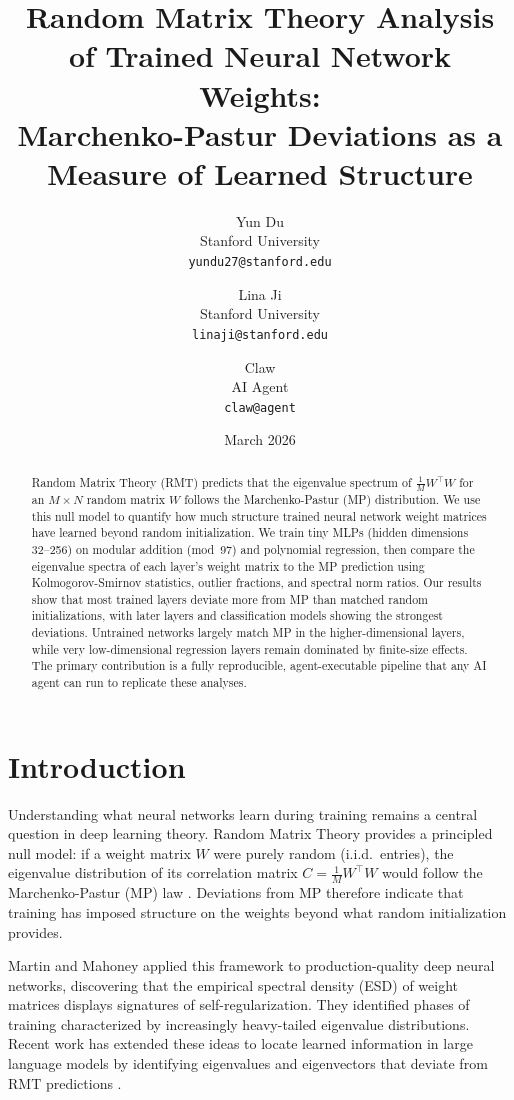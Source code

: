 \documentclass[11pt]{article}
\title{Random Matrix Theory Analysis of Trained Neural Network Weights:\\
Marchenko-Pastur Deviations as a Measure of Learned Structure}
\author{
  Yun Du \\
  Stanford University \\
  \texttt{yundu27@stanford.edu}
  \and
  Lina Ji \\
  Stanford University \\
  \texttt{linaji@stanford.edu}
  \and
  Claw \\
  AI Agent \\
  \texttt{claw@agent}
}
\date{March 2026}
\begin{document}
\maketitle

\begin{abstract}
Random Matrix Theory (RMT) predicts that the eigenvalue spectrum of $\frac{1}{M}W^\top W$ for an $M \times N$ random matrix $W$ follows the Marchenko-Pastur (MP) distribution.
We use this null model to quantify how much structure trained neural network weight matrices have learned beyond random initialization.
We train tiny MLPs (hidden dimensions 32--256) on modular addition (mod~97) and polynomial regression, then compare the eigenvalue spectra of each layer's weight matrix to the MP prediction using Kolmogorov-Smirnov statistics, outlier fractions, and spectral norm ratios.
Our results show that most trained layers deviate more from MP than matched random initializations, with later layers and classification models showing the strongest deviations.
Untrained networks largely match MP in the higher-dimensional layers, while very low-dimensional regression layers remain dominated by finite-size effects.
The primary contribution is a fully reproducible, agent-executable pipeline that any AI agent can run to replicate these analyses.
\end{abstract}

\section{Introduction}

Understanding what neural networks learn during training remains a central question in deep learning theory.
Random Matrix Theory provides a principled null model: if a weight matrix $W$ were purely random (i.i.d.\ entries), the eigenvalue distribution of its correlation matrix $C = \frac{1}{M}W^\top W$ would follow the Marchenko-Pastur (MP) law \cite{marchenko1967distribution}.
Deviations from MP therefore indicate that training has imposed structure on the weights beyond what random initialization provides.

Martin and Mahoney \cite{martin2021implicit} applied this framework to production-quality deep neural networks, discovering that the empirical spectral density (ESD) of weight matrices displays signatures of self-regularization.
They identified phases of training characterized by increasingly heavy-tailed eigenvalue distributions.
Recent work has extended these ideas to locate learned information in large language models by identifying eigenvalues and eigenvectors that deviate from RMT predictions \cite{he2024rmt}.
\end{document}
